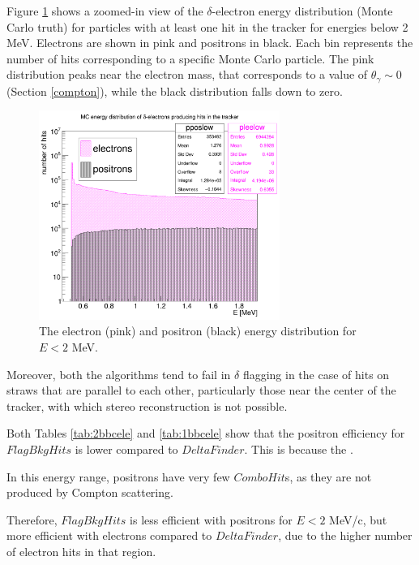 Figure \ref{fig:detail} shows a zoomed-in view of the 
$\delta$-electron energy 
distribution (Monte Carlo truth) for particles with  
at least one hit in the 
tracker for energies below 
2 MeV. Electrons are shown in 
pink and positrons in black. 
Each bin represents the number 
of hits corresponding to a 
specific Monte Carlo particle. 
The pink distribution peaks 
near the electron mass, that 
corresponds to a value of $\theta_\gamma \sim 0$ (Section \ref{compton}), 
while the black distribution falls down 
to zero.


\begin{figure}[!h]
    \centering
    \includegraphics[width =0.7\textwidth]{figures/png/Screenshot_20240820_154854.png}
    \caption[The $\delta$-electrons energy distribution.]{The electron (pink) and positron (black) 
    energy distribution for $E<2$ MeV.}
    \label{fig:detail}
\end{figure}

Moreover, both the algorithms tend to fail 
in $\delta$ flagging in the case of  
hits on straws that are 
parallel to each other, particularly 
those near the center of the tracker, 
with which stereo reconstruction is not possible. 

Both Tables \ref{tab:2bbcele} and \ref{tab:1bbcele} 
show that the positron 
efficiency for $FlagBkgHits$ is lower 
compared to $DeltaFinder$. 
This is because the .

In this 
energy range, positrons have very few $ComboHit$s, as 
they are not produced by Compton scattering.

Therefore, $FlagBkgHits$ is less efficient with 
positrons for $E < 2$ MeV/c, but more efficient with electrons compared to 
$DeltaFinder$, due to the higher number of electron hits in that region.

